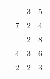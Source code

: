 \documentclass[a4paper,12pt]{article}
\begin{document}
\begin{center}
\begin{tabu}{cccc}
&&3&5\\
&7&2&4\\
&&2&8\\
&4&3&6\\ \hline
{}&2&2&3 \\
\end{tabu}
\end{center}
\end{document}
